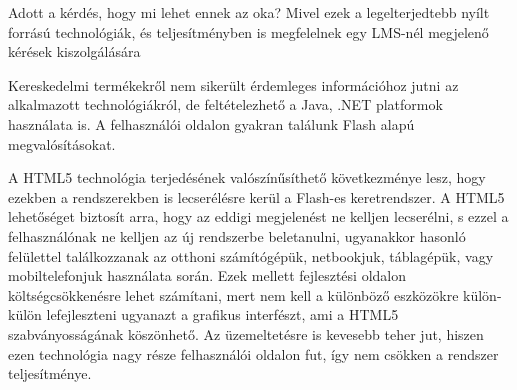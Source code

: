 

Adott a kérdés, hogy mi lehet ennek az oka? Mivel ezek a legelterjedtebb nyílt forrású technológiák, és teljesítményben is megfelelnek egy LMS-nél megjelenő kérések kiszolgálására


Kereskedelmi termékekről nem sikerült érdemleges információhoz jutni az alkalmazott technológiákról, de feltételezhető a Java, .NET platformok használata is. A felhasználói oldalon gyakran találunk Flash alapú megvalósításokat.

A HTML5 technológia terjedésének valószínűsíthető következménye lesz, hogy ezekben a rendszerekben is lecserélésre kerül a Flash-es keretrendszer. A HTML5 lehetőséget biztosít arra, hogy az eddigi megjelenést ne kelljen lecserélni, s ezzel a felhasználónak ne kelljen az új rendszerbe beletanulni, ugyanakkor hasonló felülettel találkozzanak az otthoni számítógépük, netbookjuk, táblagépük, vagy mobiltelefonjuk használata során. Ezek mellett fejlesztési oldalon költségcsökkenésre lehet számítani, mert nem kell a különböző eszközökre külön-külön lefejleszteni ugyanazt a grafikus interfészt, ami a HTML5 szabványosságának köszönhető. Az üzemeltetésre is kevesebb teher jut, hiszen ezen technológia nagy része felhasználói oldalon fut, így nem csökken a rendszer teljesítménye.


\begin{comment}


\bibitem[ell] {link:ell}
	Ellis, Ryann K. {\it A Field Guide to Learning Management Systems}, ASTD Learning Circuits, 2009 \\ \href{http://www.astd.org/NR/rdonlyres/12ECDB99-3B91-403E-9B15-7E597444645D/23395/LMS\_fieldguide\_20091.pdf}{http://www.astd.org/NR/rdonlyres/.../LMS\_fieldguide\_20091.pdf}

\bibitem[lms] {link:lms}
	Wikipedia, {\it List of learning management systems} \\ \href{http://en.wikipedia.org/wiki/List\_of\_learning\_management\_systems}{http://en.wikipedia.org/wiki/List\_of\_learning\_management\_systems}

\end{comment}
